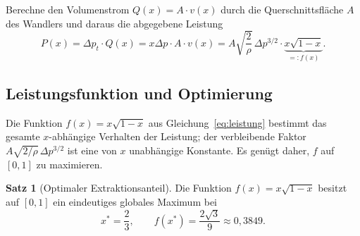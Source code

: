 ﻿\documentclass[a4paper,12pt]{article}
\theoremstyle{definition}
\newtheorem{satz}{Satz}
\begin{document}
Berechne den Volumenstrom $Q(x) = A \cdot v(x)$ durch die Querschnittsfläche
$A$ des Wandlers und daraus die abgegebene Leistung
\begin{equation}
	\label{eq:leistung}
	P(x) = \Delta p_t \cdot Q(x) = x\Delta p \cdot A \cdot v(x)
	= A \sqrt{\frac{2}{\rho}}\, \Delta p^{3/2} \cdot \underbrace{x\sqrt{1-x}}_{=:f(x)}.
\end{equation}

\subsection{Leistungsfunktion und Optimierung}
\label{sec:optimierung}

Die Funktion $f(x) = x\sqrt{1-x}$ aus Gleichung~\eqref{eq:leistung}
bestimmt das gesamte $x$-abhängige Verhalten der Leistung; der
verbleibende Faktor $A\sqrt{2/\rho}\,\Delta p^{3/2}$ ist eine von $x$
unabhängige Konstante. Es genügt daher, $f$ auf $[0,1]$ zu maximieren.

\begin{satz}[Optimaler Extraktionsanteil]
	\label{satz:optimal_x}
	Die Funktion $f(x) = x\sqrt{1-x}$ besitzt auf $[0,1]$ ein eindeutiges
	globales Maximum bei
	\[
		x^\ast = \frac{2}{3}, \qquad
		f(x^\ast) = \frac{2\sqrt{3}}{9} \approx 0{,}3849.
	\]
\end{satz}
\end{document}
